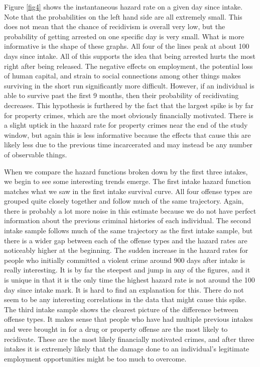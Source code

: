 \documentclass{article}
\begin{document}
Figure \ref{fig4} shows the instantaneous hazard rate on a given day since intake. Note that the probabilities on the left hand side are all extremely small. This does not mean that the chance of recidivism is overall very low, but the probability of getting arrested on one specific day is very small. What is more informative is the shape of these graphs. All four of the lines peak at about 100 days since intake. All of this supports the idea that being arrested hurts the most right after being released. The negative effects on employment, the potential loss of human capital, and strain to social connections among other things makes surviving in the short run significantly more difficult. However, if an individual is able to survive past the first 9 months, then their probability of recidivating decreases. This hypothesis is furthered by the fact that the largest spike is by far for property crimes, which are the most obviously financially motivated. There is a slight uptick in the hazard rate for property crimes near the end of the study window, but again this is less informative because the effects that cause this are likely less due to the previous time incarcerated and may instead be any number of observable things.

When we compare the hazard functions broken down by the first three intakes, we begin to see some interesting trends emerge. The first intake hazard function matches what we saw in the first intake survival curve. All four offense types are grouped quite closely together and follow much of the same trajectory. Again, there is probably a lot more noise in this estimate because we do not have perfect information about the previous criminal histories of each individual. The second intake sample follows much of the same trajectory as the first intake sample, but there is a wider gap between each of the offense types and the hazard rates are noticeably higher at the beginning. The sudden increase in the hazard rates for people who initially committed a violent crime around 900 days after intake is really interesting. It is by far the steepest and jump in any of the figures, and it is unique in that it is the only time the highest hazard rate is not around the 100 day since intake mark. It is hard to find an explanation for this. There do not seem to be any interesting correlations in the data that might cause this spike. The third intake sample shows the clearest picture of the difference between offense types. It makes sense that people who have had multiple previous intakes and were brought in for a drug or property offense are the most likely to recidivate. These are the most likely financially motivated crimes, and after three intakes it is extremely likely that the damage done to an individual's legitimate employment opportunities might be too much to overcome.  
\end{document}
